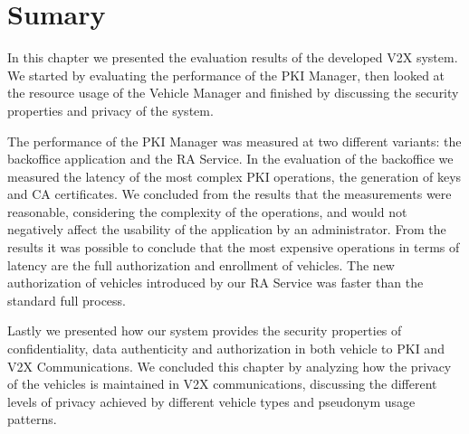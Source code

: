 			
			\section{Sumary}
			In this chapter we presented the evaluation results of the developed V2X system. We started by evaluating the performance of the PKI Manager, then looked at the resource usage of the Vehicle Manager and finished by discussing the security properties and privacy of the system.
			
			The performance of the PKI Manager was measured at two different variants: the backoffice application and the RA Service. In the evaluation of the backoffice we measured the latency of the most complex PKI operations, the generation of keys and CA certificates. We concluded from the results that the measurements were reasonable, considering the complexity of the operations, and would not negatively affect the usability of the application by an administrator. From the results it was possible to conclude that the most expensive operations in terms of latency are the full authorization and enrollment of vehicles. The new authorization of vehicles introduced by our RA Service was faster than the standard full process. 
			
			Lastly we presented how our system provides the security properties of confidentiality, data authenticity and authorization in both vehicle to PKI and V2X Communications. We concluded this chapter by analyzing how the privacy of the vehicles is maintained in V2X communications, discussing the different levels of privacy achieved by different vehicle types and pseudonym usage patterns.
			

